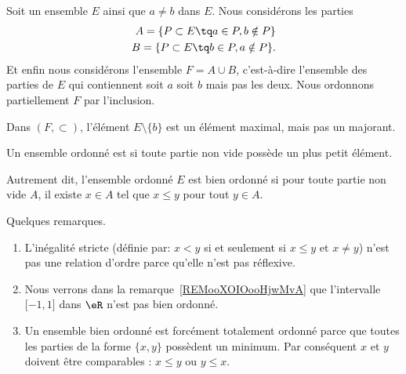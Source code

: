 \begin{example} \label{ExeooMaximalPasMajorant}
	Soit un ensemble \( E\) ainsi que \( a\neq b\) dans \( E\). Nous considérons les parties
	\begin{subequations}
		\begin{align}
			A=\{ P\subset E\tq a\in P,b\notin P \} \\
			B=\{ P\subset E\tq b\in P,a\notin P \}.
		\end{align}
	\end{subequations}
	Et enfin nous considérons l'ensemble \( F=A\cup B\), c'est-à-dire l'ensemble des parties de \( E\) qui contiennent soit \( a\) soit \( b\) mais pas les deux. Nous ordonnons partiellement \( F\) par l'inclusion.

	Dans \( (F,\subset)\), l'élément \( E\setminus\{ b \}\) est un élément maximal, mais pas un majorant.
\end{example}

\begin{definition}   \label{DEFooLJEAooBLGsiS}
	Un ensemble ordonné est  si toute partie non vide possède un plus petit élément.

	Autrement dit, l'ensemble ordonné \( E\) est bien ordonné si pour toute partie non vide \( A\), il existe \( x\in A\) tel que \( x\leq y\) pour tout \( y\in A\).
\end{definition}

\begin{normaltext}  \label{NorooOrdreBienOrdonne}
	Quelques remarques.
	\begin{enumerate}
		\item
		      L'inégalité stricte (définie par: \( x<y\) si et seulement si \( x\leq y\) et \( x\neq y\)) n'est pas une relation d'ordre parce qu'elle n'est pas réflexive.
		\item
		      Nous verrons dans la remarque~\ref{REMooXOIOooHjwMvA}%
		      que l'intervalle \( \mathopen[ -1 , 1 \mathclose]\) dans \( \eR\) n'est pas bien ordonné.
		\item
		      Un ensemble bien ordonné est forcément totalement ordonné parce que toutes les parties de la forme \( \{ x,y \}\) possèdent un minimum. Par conséquent \( x\) et \( y\) doivent être comparables : \( x\leq y\) ou \( y\leq x\).
	\end{enumerate}
\end{normaltext}



